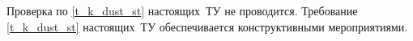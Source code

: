 Проверка по \ref{t_k_dust_st} настоящих~ТУ не проводится. Требование \ref{t_k_dust_st} настоящих~ТУ обеспечивается конструктивными мероприятиями.